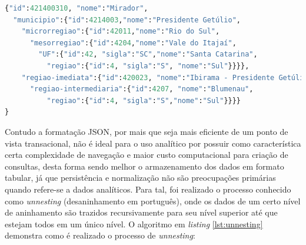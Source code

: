 \begin{lstlisting}[float = h, label={lst:exemplo-api-localidades},language=Python, caption=Exemplo de resultado de uma requisição da API de localidades.]
{"id":421400310, "nome":"Mirador",
  "municipio":{"id":4214003,"nome":"Presidente Getúlio",
    "microrregiao":{"id":42011,"nome":"Rio do Sul",
      "mesorregiao":{"id":4204,"nome":"Vale do Itajaí",
        "UF":{"id":42, "sigla":"SC","nome":"Santa Catarina",
          "regiao":{"id":4, "sigla":"S", "nome":"Sul"}}}},
    "regiao-imediata":{"id":420023, "nome":"Ibirama - Presidente Getúlio",
      "regiao-intermediaria":{"id":4207, "nome":"Blumenau",
          "regiao":{"id":4, "sigla":"S","nome":"Sul"}}}}
}
\end{lstlisting}



    Contudo a formatação JSON, por mais que seja mais eficiente de um ponto de vista transacional, não é ideal para o uso analítico por possuir como característica certa complexidade de navegação e maior custo computacional para criação de consultas, desta forma sendo melhor o armazenamento dos dados em formato tabular, já que persistência e normalização não são preocupações primárias quando refere-se a dados analíticos. Para tal, foi realizado o processo conhecido como \textit{unnesting} (desaninhamento em português), onde os dados de um certo nível de aninhamento são trazidos recursivamente para seu nível superior até que estejam todos em um único nível. O algoritmo em \textit{listing} \ref{lst:unnesting} demonstra como é realizado o processo de \textit{unnesting}:

\bigskip

